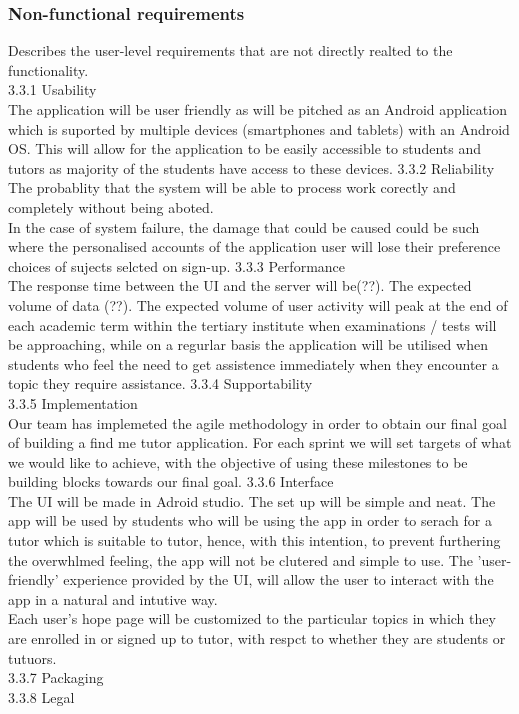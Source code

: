 \documentclass[12pt]{article}
\begin{document}
\subsubsection{Non-functional requirements}
Describes the user-level requirements that are not directly realted to the functionality. \\
3.3.1 Usability\\
The application will be user friendly as will be pitched as an Android application which is suported by multiple devices (smartphones and tablets) with an Android OS. This will allow for the application to be easily accessible to students and tutors as majority of the students have access to these devices. 
3.3.2 Reliability\\
The probablity that the system will be able to process work corectly and completely without being aboted.\\
In the case of system failure, the damage that could be caused could be such where the personalised accounts of the application user will lose their preference choices of sujects selcted on sign-up. 
3.3.3 Performance\\
The response time between the UI and the server will be(??). The expected volume of data (??). The expected volume of user activity will peak at the end of each academic term within the tertiary institute when examinations / tests will be approaching, while on a regurlar basis the application will be utilised when students who feel the need to get assistence immediately when they encounter a topic they require assistance. 
3.3.4 Supportability\\
3.3.5 Implementation\\
Our team has implemeted the agile methodology in order to obtain our final goal of building a find me tutor application. For each sprint we will set targets of what we would like to achieve, with the objective of using these milestones to be building blocks towards our final goal. 
3.3.6 Interface\\
The UI will be made in Adroid studio. The set up will be simple and neat. The app will be used by students who will be using the app in order to serach for a tutor which is suitable to tutor, hence, with this intention, to prevent furthering the overwhlmed feeling, the app will not be clutered and simple to use. The 'user-friendly' experience provided by the UI, will allow the user to interact with the app in a natural and intutive way. \\
Each user's hope page will be customized to the particular topics in which they are enrolled in or signed up to tutor, with respct to whether they are students or tutuors. \\
3.3.7 Packaging\\
3.3.8 Legal\\
\end{document}

